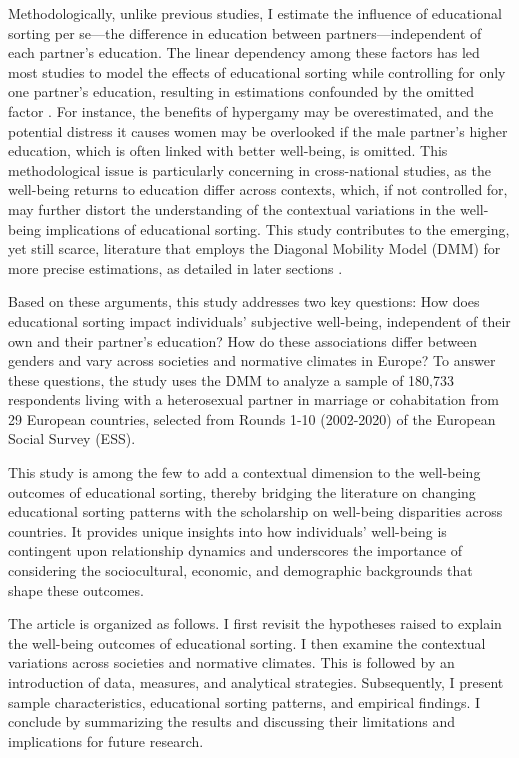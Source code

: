 Methodologically, unlike previous studies, I estimate the influence of educational sorting per se—the difference in education between partners—independent of each partner's education. The linear dependency among these factors has led most studies to model the effects of educational sorting while controlling for only one partner's education, resulting in estimations confounded by the omitted factor \parencite{eeckhautAnalysingEffectEducational2013}. For instance, the benefits of hypergamy may be overestimated, and the potential distress it causes women may be overlooked if the male partner's higher education, which is often linked with better well-being, is omitted. This methodological issue is particularly concerning in cross-national studies, as the well-being returns to education differ across contexts, which, if not controlled for, may further distort the understanding of the contextual variations in the well-being implications of educational sorting. This study contributes to the emerging, yet still scarce, literature that employs the Diagonal Mobility Model (DMM) for more precise estimations, as detailed in later sections \parencite{sobelDiagonalMobilityModels1981,zangMobilityEffectsHypothesis2023}.

Based on these arguments, this study addresses two key questions: How does educational sorting impact individuals' subjective well-being, independent of their own and their partner's education? How do these associations differ between genders and vary across societies and normative climates in Europe? To answer these questions, the study uses the DMM to analyze a sample of 180,733 respondents living with a heterosexual partner in marriage or cohabitation from 29 European countries, selected from Rounds 1-10 (2002-2020) of the European Social Survey (ESS).

This study is among the few to add a contextual dimension to the well-being outcomes of educational sorting, thereby bridging the literature on changing educational sorting patterns with the scholarship on well-being disparities across countries. It provides unique insights into how individuals' well-being is contingent upon relationship dynamics and underscores the importance of considering the sociocultural, economic, and demographic backgrounds that shape these outcomes.

The article is organized as follows. I first revisit the hypotheses raised to explain the well-being outcomes of educational sorting. I then examine the contextual variations across societies and normative climates. This is followed by an introduction of data, measures, and analytical strategies. Subsequently, I present sample characteristics, educational sorting patterns, and empirical findings. I conclude by summarizing the results and discussing their limitations and implications for future research.
